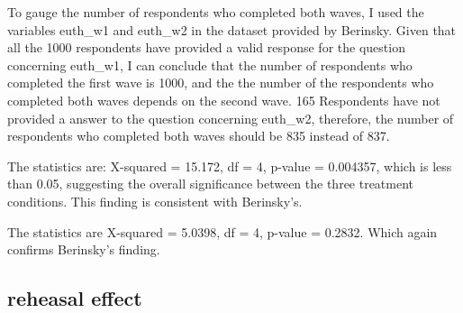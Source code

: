 \documentclass[AER]{AEA}
\begin{document}
To gauge the number of respondents who completed both waves, I used the
variables euth\_w1 and euth\_w2 in the dataset provided by Berinsky.
Given that all the 1000 respondents have provided a valid response for
the question concerning euth\_w1, I can conclude that the number of
respondents who completed the first wave is 1000, and the the number of
the respondents who completed both waves depends on the second wave. 165
Respondents have not provided a answer to the question concerning
euth\_w2, therefore, the number of respondents who completed both waves
should be 835 instead of 837.

\begin{table}

\caption{\label{tab:unnamed-chunk-15}Recall effects in Study 2 (Wave 1)}
\centering
{}
\end{table}

The statistics are: X-squared = 15.172, df = 4, p-value = 0.004357,
which is less than 0.05, suggesting the overall significance between the
three treatment conditions. This finding is consistent with Berinsky's.

\begin{table}

\caption{\label{tab:unnamed-chunk-16}Recall effects in Study 2 (Wave 2)}
\centering
{}
\end{table}

The statistics are X-squared = 5.0398, df = 4, p-value = 0.2832. Which
again confirms Berinsky's finding.

\hypertarget{reheasal-effect}{%
\subsection{reheasal effect}\label{reheasal-effect}}
\end{document}
